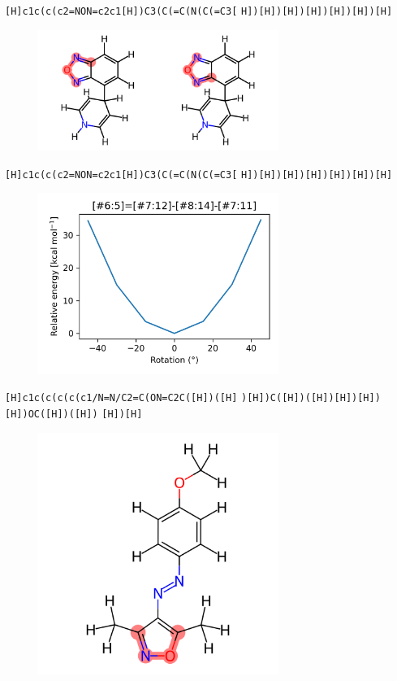 \documentclass{beamer}
\begin{document}
\begin{frame}[fragile]
\verb|[H]c1c(c(c2=NON=c2c1[H])C3(C(=C(N(C(=C3[|
\verb|H])[H])[H])[H])[H])[H])[H]|

\begin{figure}
    \includegraphics[width=0.7\textwidth,height=0.7\textheight,keepaspectratio]{mol00.png}
\end{figure}
\end{frame}
\begin{frame}[fragile]
\verb|[H]c1c(c(c2=NON=c2c1[H])C3(C(=C(N(C(=C3[|
\verb|H])[H])[H])[H])[H])[H])[H]|

\begin{figure}
    \includegraphics[width=0.7\textwidth,height=0.7\textheight,keepaspectratio]{plot00.png}
\end{figure}
\end{frame}
\begin{frame}[fragile]
\verb|[H]c1c(c(c(c(c1/N=N/C2=C(ON=C2C([H])([H]|
\verb|)[H])C([H])([H])[H])[H])[H])OC([H])([H])|
\verb|[H])[H]|

\begin{figure}
    \includegraphics[width=0.7\textwidth,height=0.7\textheight,keepaspectratio]{mol06.png}
\end{figure}
\end{frame}
\end{document}
